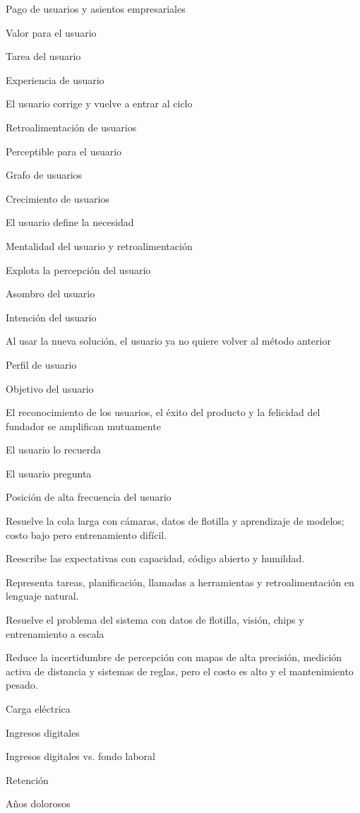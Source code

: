 \documentclass{article}
\begin{document}
Pago de usuarios y asientos empresariales

Valor para el usuario

Tarea del usuario

Experiencia de usuario

El usuario corrige y vuelve a entrar al ciclo

Retroalimentación de usuarios

Perceptible para el usuario

Grafo de usuarios

Crecimiento de usuarios

El usuario define la necesidad

Mentalidad del usuario y retroalimentación

Explota la percepción del usuario

Asombro del usuario

Intención del usuario

Al usar la nueva solución, el usuario ya no quiere volver al método anterior

Perfil de usuario

Objetivo del usuario

El reconocimiento de los usuarios, el éxito del producto y la felicidad del fundador se amplifican mutuamente

El usuario lo recuerda

El usuario pregunta

Posición de alta frecuencia del usuario

Resuelve la cola larga con cámaras, datos de flotilla y aprendizaje de modelos; costo bajo pero entrenamiento difícil.

Reescribe las expectativas con capacidad, código abierto y humildad.

Representa tareas, planificación, llamadas a herramientas y retroalimentación en lenguaje natural.

Resuelve el problema del sistema con datos de flotilla, visión, chips y entrenamiento a escala

Reduce la incertidumbre de percepción con mapas de alta precisión, medición activa de distancia y sistemas de reglas, pero el costo es alto y el mantenimiento pesado.

Carga eléctrica

Ingresos digitales

Ingresos digitales vs. fondo laboral

Retención

Años dolorosos
\end{document}
